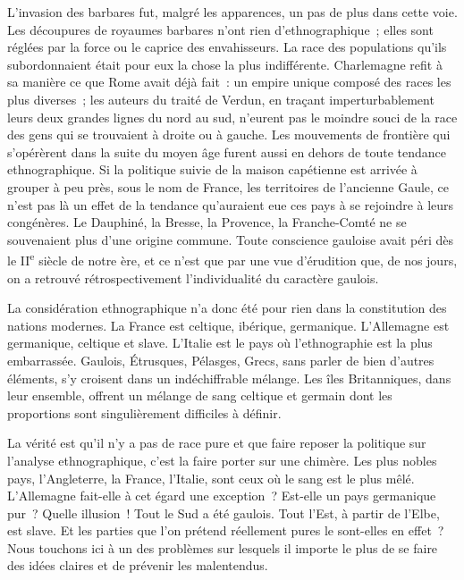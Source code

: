 \documentclass[french,twoside]{book} %
\newcommand\orgName[1]{#1}
\newcommand\persName[1]{#1}
\newcommand\placeName[1]{#1}
\begin{document}
L’invasion des {\orgName barbares} fut, malgré les apparences, un pas de plus dans cette voie. Les découpures de {\placeName royaumes barbares} n’ont rien d’ethnographique ; elles sont réglées par la force ou le caprice des envahisseurs. La race des populations qu’ils subordonnaient était pour eux la chose la plus indifférente. {\persName Charlemagne} refit à sa manière ce que {\orgName Rome} avait déjà fait : un empire unique composé des races les plus diverses ; les auteurs du traité de Verdun, en traçant imperturbablement leurs deux grandes lignes du nord au sud, n’eurent pas le moindre souci de la race des gens qui se trouvaient à droite ou à gauche. Les mouvements de frontière qui s’opérèrent dans la suite du moyen âge furent aussi en dehors de toute tendance ethnographique. Si la politique suivie de la maison capétienne est arrivée à grouper à peu près, sous le nom de {\placeName France}, les territoires de l’ancienne {\placeName Gaule}, ce n’est pas là un effet de la tendance qu’auraient eue ces pays à se rejoindre à leurs congénères. Le {\placeName Dauphiné}, la {\placeName Bresse}, la {\placeName Provence}, la {\placeName Franche-Comté} ne se souvenaient plus d’une origine commune. Toute conscience gauloise avait péri dès le II\textsuperscript{e} siècle de notre ère, et ce n’est que par une vue d’érudition que, de nos jours, on a retrouvé rétrospectivement l’individualité du caractère gaulois.\par
La considération ethnographique n’a donc été pour rien dans la constitution des nations modernes. La {\orgName France} est celtique, ibérique, germanique. L’{\orgName Allemagne} est germanique, celtique et slave. L’{\orgName Italie} est le pays où l’ethnographie est la plus embarrassée. {\orgName Gaulois}, {\orgName Étrusques}, {\orgName Pélasges}, {\orgName Grecs}, sans parler de bien d’autres éléments, s’y croisent dans un indéchiffrable mélange. Les {\orgName îles Britanniques}, dans leur ensemble, offrent un mélange de sang celtique et germain dont les proportions sont singulièrement difficiles à définir.\par
La vérité est qu’il n’y a pas de race pure et que faire reposer la politique sur l’analyse ethnographique, c’est la faire porter sur une chimère. Les plus nobles pays, l’{\placeName Angleterre}, la {\placeName France}, l’{\placeName Italie}, sont ceux où le sang est le plus mêlé. L’{\placeName Allemagne} fait-elle à cet égard une exception ? Est-elle un pays germanique pur ? Quelle illusion ! Tout le {\placeName Sud} a été gaulois. Tout l’{\placeName Est}, à partir de l’{\placeName Elbe}, est slave. Et les parties que l’on prétend réellement pures le sont-elles en effet ? Nous touchons ici à un des problèmes sur lesquels il importe le plus de se faire des idées claires et de prévenir les malentendus.\par
\end{document}
